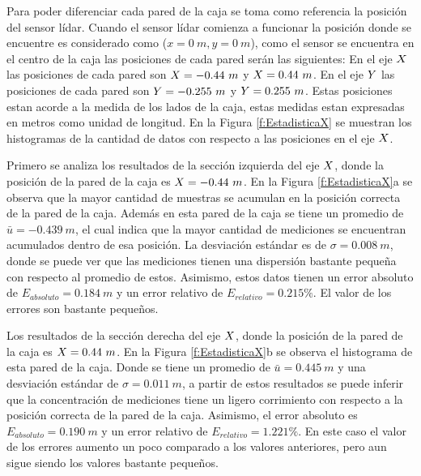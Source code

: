 Para poder diferenciar cada pared de la caja se toma como referencia la posición 
del sensor lídar. Cuando el sensor lídar comienza a funcionar la posición donde
se encuentre es considerado como ($x = 0~m, y = 0~m$), como el sensor
se encuentra en el centro de la caja las posiciones de cada pared serán las 
siguientes: En el eje $\mathnormal X$ las posiciones de cada pared son $\mathnormal X = -0.44~m$ 
y $\mathnormal X = 0.44~m$. En el eje $\mathnormal Y$ las posiciones de cada pared son 
$\mathnormal Y = -0.255~m$ y $\mathnormal Y = 0.255~m$. Estas posiciones estan acorde a la medida
de los lados de la caja, estas medidas estan expresadas en metros como unidad 
de longitud. En la Figura \ref{f:EstadisticaX} se muestran los histogramas de 
la cantidad de datos con respecto a las posiciones en el eje $\mathnormal X$.

Primero se analiza los resultados de la sección izquierda del eje $\mathnormal X$, donde 
la posición de la pared de la caja es $\mathnormal X = -0.44~m$. En la Figura 
\ref{f:EstadisticaX}a se observa que la mayor cantidad de muestras se acumulan en 
la posición correcta de la pared de la caja. Además en esta pared de la caja se 
tiene un promedio de $\bar{u} = -0.439~m$, el cual indica que la mayor cantidad de 
mediciones se encuentran acumulados dentro de esa posición. La desviación estándar 
es de $\sigma = 0.008~m$, donde se puede ver que las mediciones tienen una dispersión 
bastante pequeña con respecto al promedio de estos. Asimismo, estos datos tienen un 
error absoluto de $E_{absoluto} = 0.184~m$ y un error relativo de $E_{relativo} = 
0.215\%$. El valor de los errores son bastante pequeños.

Los resultados de la sección derecha del eje $\mathnormal X$, donde la posición de la
pared de la caja es $\mathnormal X = 0.44~m$. En la Figura \ref{f:EstadisticaX}b se observa 
el histograma de esta pared de la caja. Donde se tiene un promedio de $\bar{u} = 0.445~m$ 
y una desviación estándar de $\sigma = 0.011~m$, a partir de estos resultados se puede 
inferir que la concentración de mediciones tiene un ligero corrimiento con respecto a 
la posición correcta de la pared de la caja. Asimismo, el error absoluto es 
$E_{absoluto} = 0.190~m$ y un error relativo de $E_{relativo} = 1.221\%$. En este caso
el valor de los errores aumento un poco comparado a los valores anteriores, pero aun 
sigue siendo los valores bastante pequeños.


